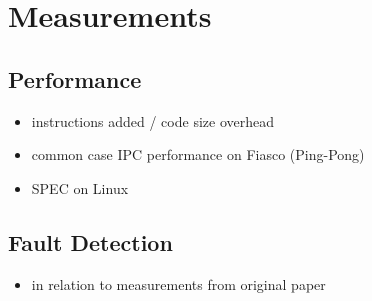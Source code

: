 \section{Measurements}

\subsection{Performance}

\begin{itemize}
  \item instructions added / code size overhead
  \item common case IPC performance on Fiasco (Ping-Pong)
  \item SPEC on Linux
\end{itemize}

\subsection{Fault Detection}

\begin{itemize}
  \item in relation to measurements from original paper
\end{itemize}

